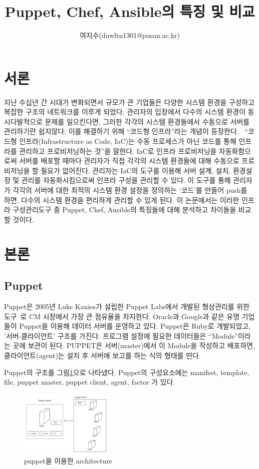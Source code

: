 \documentclass{pnu-survey}
\title{Puppet, Chef, Ansible의 특징 및 비교}
\author{여지수(duwltn1301@pusan.ac.kr)}
\begin{document}
\maketitle

\section{서론}

지난 수십년 간 시대가 변화되면서 규모가 큰 기업들은 다양한 시스템 환경을 구성하고 복잡한 구조의 네트워크를 이루게 되었다. 관리자의 입장에서 다수의 시스템 환경이 동시다발적으로 문제를 일으킨다면, 그러한 각각의 시스템 환경들에서 수동으로 서버를 관리하기란 쉽지않다. 이를 해결하기 위해 “코드형 인프라”라는 개념이 등장한다. ~\cite{iac}“코드형 인프라(Infrastructure as Code, IaC)는 수동 프로세스가 아닌 코드를 통해 인프라를 관리하고 프로비저닝하는 것”을 말한다. IaC로 인프라 프로비저닝을 자동화함으로써 서버를 배포할 때마다 관리자가 직접 각각의 시스템 환경들에 대해 수동으로 프로비저닝을 할 필요가 없어진다. 관리자는 IaC의 도구를 이용해 서버 설계, 설치, 환경설정 및 관리를 자동화시킴으로써 인프라 구성을 관리할 수 있다. 이 도구를 통해 관리자가 각각의 서버에 대한 최적의 시스템 환경 설정을 정의하는 ‘코드’를 만들어 push를 하면, 다수의 시스템 환경을 편리하게 관리할 수 있게 된다. 이 논문에서는 이러한 인프라 구성관리도구 중 Puppet, Chef, Ansible의 특징들에 대해 분석하고 차이들을 비교할 것이다.

\section{본론}

\subsection{Puppet}

Puppet은 2005년 Luke Kanies가 설립한  Puppet Labs에서 개발된 형상관리를 위한 도구~\cite{puppet}로 CM 시장에서 가장 큰 점유율을 차지한다. Oracle과 Google과 같은 유명 기업들이 Puppet을 이용해 데이터 서버를 운영하고 있다. Puppet은 Ruby로 개발되었고, '서버-클라이언트' 구조를 가진다. 프로그램 설정에 필요한 데이터들은 “Module”이라는 곳에 보관이 된다. PUPPET은 서버(master)에서 이 Module을 작성하고 배포하면, 클라이언트(agent)는 설치 후 서버에 보고를 하는 식의 형태를 띤다. 

Puppet의 구조를 그림\ref{fig:puppet}으로 나타냈다. Puppet의 구성요소에는 manifest, template, file, puppet master, puppet client, agent, factor 가 있다.  
\begin{figure}[!ht]
\centering
\includegraphics[width=0.4\textwidth]{img/puppet.jpg}
\caption{puppet을 이용한 architecture}
\label{fig:puppet}
\end{figure}
\end{document}
